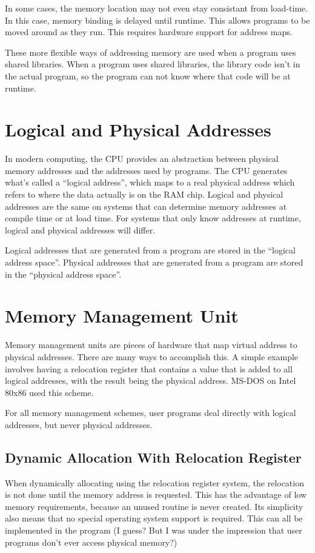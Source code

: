 \documentclass{article}
\begin{document}
In some cases, the memory location may not even stay consistant from load-time.
In this case, memory binding is delayed until runtime. This allows programs to
be moved around as they run. This requires hardware support for address maps.

These more flexible ways of addressing memory are used when a program uses
shared libraries. When a program uses shared libraries, the library code isn't
in the actual program, so the program can not know where that code will be at
runtime.

\section{Logical and Physical Addresses}
In modern computing, the CPU provides an abstraction between physical memory
addresses and the addresses used by programs. The CPU generates what's called a
``logical address'', which maps to a real physical address which refers to
where the data actually is on the RAM chip. Logical and physical addresses are
the same on systems that can determine memory addresses at compile time or at
load time. For systems that only know addresses at runtime, logical and
physical addresses will differ.

Logical addresses that are generated from a program are stored in the ``logical
address space''. Physical addresses that are generated from a program are
stored in the ``physical address space''.

\section{Memory Management Unit}
Memory management units are pieces of hardware that map virtual address to
physical addresses. There are many ways to accomplish this. A simple example
involves having a relocation register that contains a value that is added to
all logical addresses, with the result being the physical address. MS-DOS on
Intel 80x86 used this scheme.

For all memory management schemes, user programs deal directly with logical
addresses, but never physical addresses.

\subsection{Dynamic Allocation With Relocation Register}
When dynamically allocating using the relocation register system, the
relocation is not done until the memory address is requested. This has the
advantage of low memory requirements, because an unused routine is never
created. Its simplicity also means that no special operating system support is
required. This can all be implemented in the program (I guess? But I was under
the impression that user programs don't ever access physical memory?)
\end{document}
